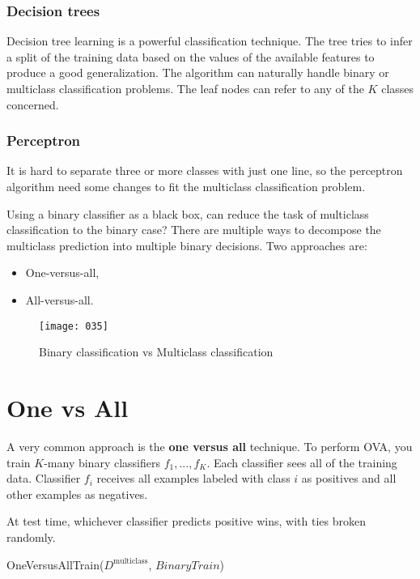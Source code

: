 \subsubsection{Decision trees}
Decision tree learning is a powerful classification technique. The tree tries to infer a split of the training data based on the values of the available features to produce a good generalization. The algorithm can naturally handle binary or multiclass classification problems. The leaf nodes can refer to any of the \(K\) classes concerned.

\subsubsection{Perceptron}
It is hard to separate three or more classes with just one line, so the perceptron algorithm need some changes to fit the multiclass classification problem.

Using a binary classifier as a black box, can reduce the task of multiclass classification to the binary case? There are multiple ways to decompose the multiclass prediction into multiple binary decisions. Two approaches are:
\begin{itemize}
    \item One-versus-all,
    \item All-versus-all.
\end{itemize}

\begin{figure}[t]
\begin{center}
    \texttt{[image: 035]}
	\vspace*{-35pt}
\end{center}
\caption{Binary classification vs Multiclass classification}
\label{fig:035}
\end{figure}

\section{One vs All}
A very common approach is the \textbf{one versus all} technique. To perform OVA, you train \(K\)-many binary classifiers \(f_1,...,f_K\). Each classifier sees all of the training data. Classifier \(f_i\) receives all examples labeled with class \(i\) as positives and all other examples as negatives.

At test time, whichever classifier predicts positive wins, with ties broken randomly.

\begin{algorithm}
    \caption{OneVersusAllTrain($D^\text{multiclass}$, $BinaryTrain$)}
    \label{alg:ovatrain}
    \end{algorithm}

